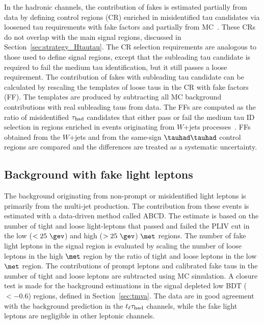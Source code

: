 \documentclass[PAPER, coverpage, atlasdraft=true, texlive=2016, UKenglish]{\ATLASLATEXPATH atlasdoc} %
\begin{document}
In the hadronic channels, the contribution of fakes is estimated partially from data by defining control regions (CR)
enriched in misidentified
tau candidates via loosened tau requirements with fake factors and partially from MC~\cite{ATLAS-CONF-2021-044}.
These CRs do not overlap with the main signal regions, discussed in Section~\ref{sec:strategy_Htautau}.
The CR selection requirements are analogous to those used to define signal regions, except
that the subleading tau candidate is required to fail the medium tau identification, but it still passes a loose requirement.
The contribution of fakes with subleading tau candidate can be calculated by rescaling the templates of loose taus in the CR
with fake factors (FF).
The templates are produced by subtracting all MC background contributions with real subleading taus from data.
The FFs are computed as the ratio of misidentified $\tau_\text{had}$ candidates that either pass or fail the medium tau ID selection in regions enriched in events originating from 
$W$+jets processes~\cite{ATLAS-CONF-2021-044}. 
FFs obtained from the $W$+jets and from the same-sign $\thadhad$ control regions are compared and the differences are treated as a systematic uncertainty.

\subsection{Background with fake light leptons}
The background originating from non-prompt or misidentified light leptons is primarily from the multi-jet production.
The contribution from these events is estimated with a data-driven method called ABCD.
The estimate is based on the number of tight and loose light-leptons that passed and failed the PLIV cut in the low ($<25~\gev$) and high
($>25~\gev$) $\met$ regions. The number of
fake light leptons in the signal region is evaluated by scaling the number of loose leptons in the high $\met$ region by the ratio of tight and loose leptons in the
low $\met$ region. The contributions of prompt leptons and calibrated fake taus in the number of tight and loose leptons are subtracted using MC simulation.
A closure test is made for the background estimations in the signal depleted low BDT ($<-0.6$) regions, defined in Section~\ref{sec:tmva}.
The data are in good agreement with the background prediction in the
$t_{\ell}\tau_{\mathrm{had}}$ channels, while the fake light leptons are negligible in other leptonic channels. 
\end{document}
